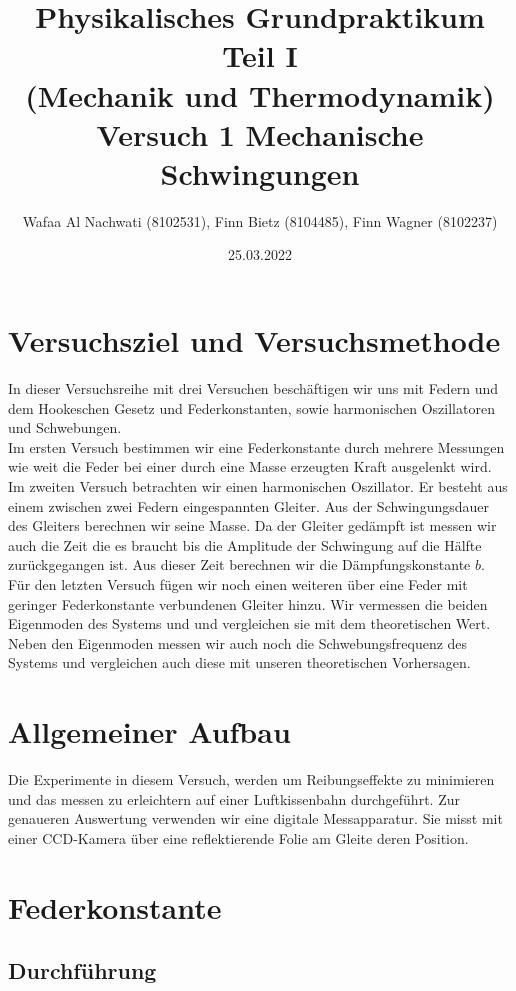 \documentclass{article}
\date{25.03.2022}
\title{Physikalisches Grundpraktikum Teil I \\ (Mechanik und Thermodynamik) \\ Versuch 1 Mechanische Schwingungen}
\author{Wafaa Al Nachwati (8102531), Finn Bietz (8104485), Finn Wagner (8102237)}
\begin{document}
	\maketitle

    \section{Versuchsziel und Versuchsmethode}
        In dieser Versuchsreihe mit drei Versuchen beschäftigen wir uns mit Federn und dem Hookeschen Gesetz und Federkonstanten,
        sowie harmonischen Oszillatoren und Schwebungen. \\
        Im ersten Versuch bestimmen wir eine Federkonstante durch mehrere Messungen wie weit die Feder bei einer durch eine Masse
        erzeugten Kraft ausgelenkt wird.
        Im zweiten Versuch betrachten wir einen harmonischen Oszillator. Er besteht aus einem zwischen zwei Federn eingespannten Gleiter.
        Aus der Schwingungsdauer des Gleiters berechnen wir seine Masse.
        Da der Gleiter gedämpft ist messen wir auch die Zeit die es braucht bis die Amplitude der Schwingung auf die Hälfte zurückgegangen ist.
        Aus dieser Zeit berechnen wir die Dämpfungskonstante \(b\). \\
        Für den letzten Versuch fügen wir noch einen weiteren über eine Feder mit geringer Federkonstante verbundenen Gleiter hinzu.
        Wir vermessen die beiden Eigenmoden des Systems und und vergleichen sie mit dem theoretischen Wert. 
        Neben den Eigenmoden messen wir auch noch die Schwebungsfrequenz des Systems und vergleichen auch diese mit unseren theoretischen Vorhersagen.

    \section{Allgemeiner Aufbau}
        Die Experimente in diesem Versuch, werden um Reibungseffekte zu minimieren und das messen zu erleichtern auf einer Luftkissenbahn durchgeführt.
        Zur genaueren Auswertung verwenden wir eine digitale Messapparatur. Sie misst mit einer CCD-Kamera über eine reflektierende Folie am Gleite deren Position.

    \section{Federkonstante}
        \subsection{Durchführung}
\end{document}
